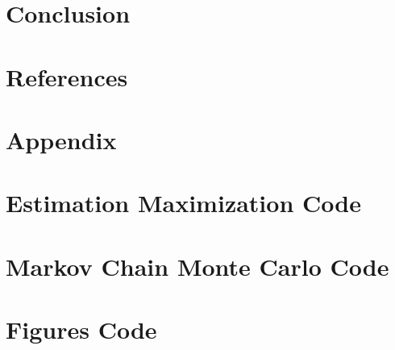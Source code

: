 \documentclass{article}
\begin{document}
\section{Conclusion}
\section{References}
\printbibliography

\section*{Appendix}
\appendix 

\section{Estimation Maximization Code}
\section{Markov Chain Monte Carlo Code}
\section{Figures Code}
\end{document}
